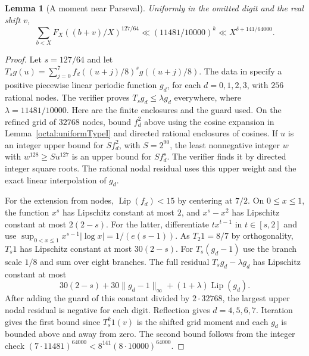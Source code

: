 \documentclass[11pt,a4paper]{article}
\theoremstyle{paperplain}
\newtheorem{lemma}[theorem]{Lemma}
\numberwithin{equation}{section}
\begin{document}
\begin{lemma}[A moment near Parseval]\label{octal:near-parseval}
Uniformly in the omitted digit and the real shift $v$,
\[
 \sum_{b<X}F_X((b+v)/X)^{127/64}
 \ll (11481/10000)^k\ll X^{\delta+141/64000}.
\]
\end{lemma}
\begin{proof}
Let $s=127/64$ and let $T_s g(u)=\sum_{j=0}^7 f_d((u+j)/8)^sg((u+j)/8)$.
The data in  specify a positive piecewise
linear periodic function $g_d$, for each $d=0,1,2,3$, with $256$ rational
nodes. The verifier proves $T_s g_d\le\lambda g_d$ everywhere, where
$\lambda=11481/10000$. Here are the finite enclosures and the guard used.
On the refined grid of $32768$ nodes, bound $f_d^2$ above using the
cosine expansion in Lemma~\ref{octal:uniformTypeI} and directed rational
enclosures of cosines. If $u$ is an integer upper bound for $Sf_d^2$,
with $S=2^{90}$, the least nonnegative integer $w$ with
$w^{128}\ge S u^{127}$ is an upper bound for $Sf_d^s$.
The verifier finds it by directed integer square roots.
The rational nodal residual uses this upper weight and the exact linear
interpolation of $g_d$.

For the extension from nodes, $\operatorname{Lip}(f_d)<15$ by centering
at $7/2$. On $0\le x\le1$, the function $x^s$ has Lipschitz constant
at most $2$, and $x^s-x^2$ has Lipschitz constant at most $2(2-s)$.
For the latter, differentiate $t x^{t-1}$ in $t\in[s,2]$ and use
$\sup_{0<x\le1}x^{s-1}|\log x|=1/(e(s-1))$. As $T_2 1=8/7$ by
orthogonality, $T_s 1$ has Lipschitz constant at most $30(2-s)$.
For $T_s(g_d-1)$ use the branch scale $1/8$ and sum over eight branches.
The full residual $T_sg_d-\lambda g_d$ has Lipschitz constant at most
\[
 30(2-s)+30\|g_d-1\|_\infty+(1+\lambda)\operatorname{Lip}(g_d).
\]
After adding the guard of this constant divided by $2\cdot32768$,
the largest upper nodal residual is negative for each digit.
Reflection gives $d=4,5,6,7$. Iteration gives the first bound since
$T_s^k1(v)$ is the shifted grid moment and each $g_d$ is bounded above
and away from zero. The second bound follows from the integer check
$(7\cdot11481)^{64000}<8^{141}(8\cdot10000)^{64000}$.
\end{proof}
\end{document}
